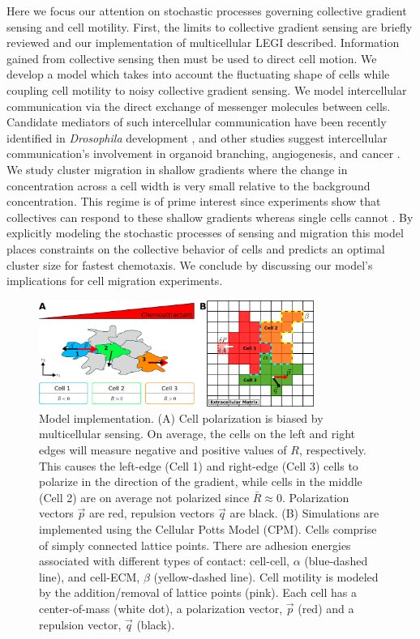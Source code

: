 Here we focus our attention on stochastic processes governing collective gradient sensing and cell motility. First, the limits to collective gradient sensing are briefly reviewed and our implementation of multicellular LEGI described. Information gained from collective sensing then must be used to direct cell motion. We develop a model which takes into account the fluctuating shape of cells while coupling cell motility to noisy collective gradient sensing. We model intercellular communication via the direct exchange of messenger molecules between cells. Candidate mediators of such intercellular communication have been recently identified in \textit{Drosophila} development \cite{ramel2013rab11}, and other studies suggest intercellular communication's involvement in organoid branching, angiogenesis, and cancer \cite{ellison2016cell,gerhardt2003vegf,hsu2000cadherin,friedl2009collective}. We study cluster migration in shallow gradients where the change in concentration across a cell width is very small relative to the background concentration. This regime is of prime interest since experiments show that collectives can respond to these shallow gradients whereas single cells cannot \cite{ellison2016cell,malet2015collective,rosoff2004new}. By explicitly modeling the stochastic processes of sensing and migration this model places constraints on the collective behavior of cells and predicts an optimal cluster size for fastest chemotaxis. We conclude by discussing our model's implications for cell migration experiments.


\begin{figure}
    \centering
        \includegraphics[width=0.8\textwidth]{../fig/ch2_fig1.png}
    \caption{Model implementation. (A) Cell polarization is biased by multicellular sensing. On average, the cells on the left and right edges will measure negative and positive values of $R$, respectively. This causes the left-edge (Cell 1) and right-edge (Cell 3) cells to polarize in the direction of the gradient, while cells in the middle (Cell 2) are on average not polarized since $\bar{R} \approx 0$. Polarization vectors $\vec{p}$ are red, repulsion vectors $\vec{q}$ are black. (B) Simulations are implemented using the Cellular Potts Model (CPM). Cells comprise of simply connected lattice points. There are adhesion energies associated with different types of contact: cell-cell, $\alpha$ (blue-dashed line), and cell-ECM, $\beta$ (yellow-dashed line). Cell motility is modeled by the addition/removal of lattice points (pink). Each cell has a center-of-mass (white dot), a polarization vector, $\vec{p}$ (red) and a repulsion vector, $\vec{q}$ (black).} \label{fig:model}
\end{figure}


